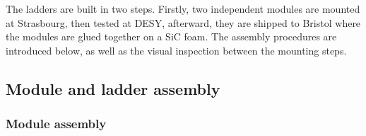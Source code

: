   The ladders are built in two steps. 
  Firstly, two independent modules are mounted at Strasbourg, then tested at DESY, afterward, they are shipped to Bristol where the modules are glued together on a \gls{SiC} foam.
  The assembly procedures are introduced below, as well as the visual inspection between the mounting steps.

  \subsection{Module and ladder assembly}

    \subsubsection{Module assembly}
    \label{subsec:modAssembly}

